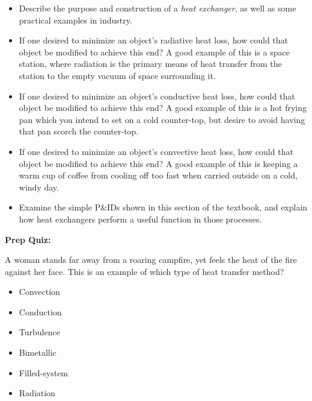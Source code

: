 \begin{itemize}
\item{} Describe the purpose and construction of a {\it heat exchanger}, as well as some practical examples in industry.
\item{} If one desired to minimize an object's radiative heat loss, how could that object be modified to achieve this end?  A good example of this is a space station, where radiation is the primary means of heat transfer from the station to the empty vacuum of space surrounding it.
\item{} If one desired to minimize an object's conductive heat loss, how could that object be modified to achieve this end?  A good example of this is a hot frying pan which you intend to set on a cold counter-top, but desire to avoid having that pan scorch the counter-top.
\item{} If one desired to minimize an object's convective heat loss, how could that object be modified to achieve this end?  A good example of this is keeping a warm cup of coffee from cooling off too fast when carried outside on a cold, windy day.
\item{} Examine the simple P\&IDs shown in this section of the textbook, and explain how heat exchangers perform a useful function in those processes.
\end{itemize}












\vfil \eject

\noindent
{\bf Prep Quiz:}

A woman stands far away from a roaring campfire, yet feels the heat of the fire against her face.  This is an example of which type of heat transfer method?

\begin{itemize}
\item{} Convection
\vskip 5pt 
\item{} Conduction
\vskip 5pt 
\item{} Turbulence
\vskip 5pt 
\item{} Bimetallic
\vskip 5pt 
\item{} Filled-system
\vskip 5pt 
\item{} Radiation
\end{itemize}









